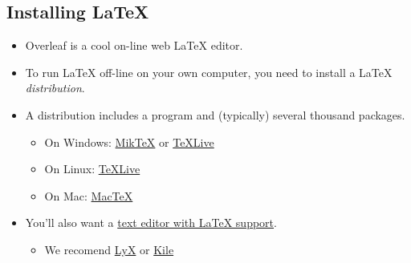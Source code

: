 \documentclass{beamer}
\begin{document}
\subsection*{Installing \LaTeX{}}
\begin{frame}{\insertsubsection}
\begin{itemize}
\item Overleaf is a cool on-line web \LaTeX{} editor.
\item To run \LaTeX{} off-line on your own computer, you need to install a \LaTeX{}
\emph{distribution}. 
\item A distribution includes a  program
and (typically) several thousand packages.
\begin{itemize}
\item On Windows: \href{http://miktex.org/}{Mik\TeX} or \href{http://tug.org/texlive/}{\TeX Live}
\item On Linux: \href{http://tug.org/texlive/}{\TeX Live}
\item On Mac: \href{http://tug.org/mactex/}{Mac\TeX}
\end{itemize}
\item You'll also want a \href{http://en.wikipedia.org/wiki/Comparison_of_TeX_editors}{text editor with \LaTeX{} support}. 
\begin{itemize}
  \item We recomend \href{https://www.lyx.org/}{LyX} or \href{https://kile.sourceforge.io/}{Kile}
\end{itemize}
\end{itemize}
\end{frame}

\end{document}

